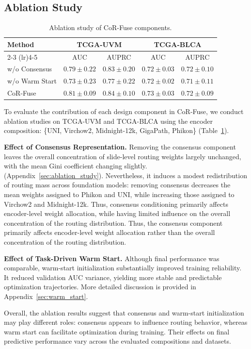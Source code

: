 \subsection{Ablation Study}
\begin{table}[htbp]
\centering
\caption{Ablation study of CoR-Fuse components.}
\label{tab:ablation}
\begin{tabular}{lcccc}
\toprule
\multirow{2}{*}{Method} & \multicolumn{2}{c}{TCGA-UVM} & \multicolumn{2}{c}{TCGA-BLCA} \\
\cmidrule(lr){2-3} \cmidrule(lr){4-5}
 & AUC & AUPRC  & AUC & AUPRC \\
\midrule
w/o Consensus & $0.79 \pm 0.22$ & $0.83 \pm 0.20$ & $0.72 \pm 0.03$ & $0.72 \pm 0.10$\\
w/o Warm Start & $0.73 \pm 0.23$ & $0.77 \pm 0.22$ & $0.72 \pm 0.02$ & $0.71 \pm 0.11$\\
CoR-Fuse & $\mathbf{0.81 \pm 0.09}$ & $\mathbf{0.84 \pm 0.10}$ & $\mathbf{0.73 \pm 0.03}$ & $\mathbf{0.72 \pm 0.09}$\\
\bottomrule
\end{tabular}
\end{table}

To evaluate the contribution of each design component in CoR-Fuse, we conduct ablation studies on TCGA-UVM and TCGA-BLCA using the encoder composition: \{UNI, Virchow2, Midnight-12k, GigaPath, Phikon\} (Table~\ref{tab:ablation}).

\textbf{Effect of Consensus Representation.}
Removing the consensus component leaves the overall concentration of slide-level routing weights largely unchanged, with the mean Gini coefficient changing slightly. (Appendix~\ref{sec:ablation_study}). 
Nevertheless, it induces a modest redistribution of routing mass across foundation models: removing consensus decreases the mean weights assigned to Phikon and UNI, while increasing those assigned to Virchow2 and Midnight-12k. 
Thus, consensus conditioning primarily affects encoder-level weight allocation, while having limited influence on the overall concentration of the routing distribution. 
Thus, the consensus component primarily affects encoder-level weight allocation rather than the overall concentration of the routing distribution.

\textbf{Effect of Task-Driven Warm Start.}
Although final performance was comparable, warm-start initialization substantially improved training reliability.
It reduced validation AUC variance, yielding more stable and predictable optimization trajectories.
More detailed discussion is provided in Appendix~\ref{sec:warm_start}. 

Overall, the ablation results suggest that consensus and warm-start initialization may play different roles: consensus appears to influence routing behavior, whereas warm start can facilitate optimization during training. Their effects on final predictive performance vary across the evaluated compositions and datasets.